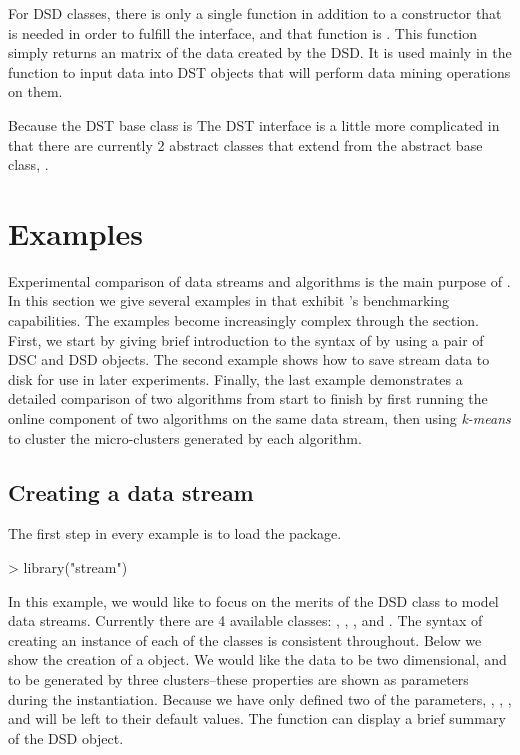 \documentclass[nojss]{jss}
\begin{document}
For DSD classes, there is only a single function in addition to a constructor that is needed in order to fulfill the interface, and that function is . This function simply returns an  matrix of the data created by the DSD. It is used mainly in the  function to input data into DST objects that will perform data mining operations on them.


Because the DST base class is The DST interface is a little more complicated in that there are currently 2 abstract classes that extend from the abstract base class, .

\section{Examples}
\label{sec:examples}

Experimental comparison of data streams and algorithms is the main purpose of . In this section we give several examples in  that exhibit 's benchmarking capabilities. The examples become increasingly complex through the section. First, we start by giving brief introduction to the syntax of  by using a pair of DSC and DSD objects. The second example shows how to save stream data to disk for use in later experiments. Finally, the last example demonstrates a detailed comparison of two algorithms from start to finish by first running the online component of two algorithms on the same data stream, then using \textit{k-means} to cluster the micro-clusters generated by each algorithm.

\subsection{Creating a data stream}
\label{examples:ds}

The first step in every example is to load the package.

\begin{Schunk}
\begin{Sinput}
> library("stream")
\end{Sinput}
\end{Schunk}

In this example, we would like to focus on the merits of the DSD class to model data streams. Currently there are 4 available classes: , , , and . The syntax of creating an instance of each of the classes is consistent throughout. Below we show the creation of a  object. We would like the data to be two dimensional, and to be generated by three clusters--these properties are shown as parameters during the instantiation. Because we have only defined two of the parameters, , , , and  will be left to their default values. The  function can display a brief summary of the DSD object.
\end{document}
